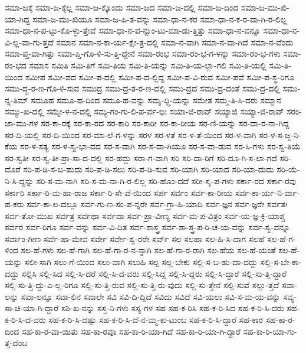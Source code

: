 {ಸಮಾ-ಜಕ್ಕೆ
ಸಮಾ-ಜ-ಕ್ಕೆಲ್ಲ
ಸಮಾ-ಜ-ಕ್ಕೊಂದು
ಸಮಾ-ಜದ
ಸಮಾ-ಜ-ದಲ್ಲಿ
ಸಮಾ-ಜ-ದಿಂದ
ಸಮಾ-ಜ-ಮು-ಖಿ-ಯಾ-ಗಿದ್ದ
ಸಮಾ-ಜ-ಮು-ಖಿಯೂ
ಸಮಾ-ಜ-ಹಿ-ತ-ವನ್ನು
ಸಮಾ-ಧಾ-ನ-ಕರ
ಸಮಾ-ಧಾ-ನ-ಕ-ರ-ವಾ-ಗಿ-ರ-ಲಿಲ್ಲ
ಸಮಾ-ಧಾ-ನ-ಪ-ಟ್ಟು-ಕೊ-ಳ್ಳು-ತ್ತೇವೆ
ಸಮಾ-ಧಾ-ನ-ವ-ನ್ನುಂ-ಟು-ಮಾ-ಡು-ತ್ತಿತ್ತು
ಸಮಾ-ಧಾ-ನ-ವನ್ನೂ
ಸಮಾ-ಧಾ-ನ-ವಿ-ಲ್ಲ-ವಾ-ಗು-ತ್ತದೆ
ಸಮಾನ
ಸಮಾ-ನ-ಕಾ-ರ್ಯ-ಕ್ಷೇ-ತ್ರ-ದಲ್ಲಿ
ಸಮಾ-ನ-ವಾಗಿ
ಸಮಾ-ನ-ವಾ-ಗಿದೆ
ಸಮಾ-ನ-ವೆಂದು
ಸಮಾ-ಪ್ತ-ವಾ-ಗಿತ್ತು
ಸಮಾ-ಪ್ತಿ-ಗೊ-ಳಿ-ಸು-ತ್ತಿ-ದ್ದೇನೆ
ಸಮಾ-ರಂಭ
ಸಮಾ-ರಂ-ಭ-ಗ-ಳನ್ನು
ಸಮಾ-ರಂ-ಭ-ಗಳು
ಸಮಾ-ರಂ-ಭದ
ಸಮಾಸ
ಸಮಿತಿ
ಸಮಿ-ತಿಗೆ
ಸಮಿ-ತಿಯ
ಸಮಿ-ತಿ-ಯನ್ನು
ಸಮಿ-ತಿ-ಯ-ಲ್ಲಾ-ಗಲಿ
ಸಮಿ-ತಿ-ಯಲ್ಲಿ
ಸಮಿ-ತಿ-ಯಿಂದ
ಸಮೀಪ
ಸಮೀ-ಪದ
ಸಮೀ-ಪ-ದಲ್ಲಿ
ಸಮೀ-ಪ-ದ-ಲ್ಲಿದ್ದ
ಸಮೀ-ಪ-ವಿ-ರುವ
ಸಮೀ-ಪವೆ
ಸಮೀ-ಪ-ಸ್ಥ-ರಿಗೂ
ಸಮು-ದ್ಧ-ರ-ಣ-ಗೊ-ಳಿ-ಸುವ
ಸಮುದ್ರ
ಸಮು-ದ್ರ-ತ-ರ-ಣ-ದಲ್ಲಿ
ಸಮು-ದ್ರದ
ಸಮು-ದ್ರ-ದಂತೆ
ಸಮು-ದ್ರ-ದಲ್ಲಿ
ಸಮು-ನ್ನ-ತಿಮ್
ಸಮೂಹ
ಸಮೂ-ಹ-ದಿಂದ
ಸಮೂ-ಹ-ವನ್ನು
ಸಮೃ-ಧ್ಧಿ-ಯನ್ನು
ಸಮೇತ
ಸಮ್ಮ-ತಿ-ಸಿ-ದರು
ಸಮ್ಮಾನ
ಸಮ್ಮು-ಖ-ದಲ್ಲಿ
ಸಮ್ಮೇ-ಳ-ನ-ದಲ್ಲಿ
ಸಮ್ಯ-ಗಂ-ಗು-ಲಿ-ಪ-ರ್ವ-ಭಿಃ
ಸಯಾ-ಜಿ-ರಾವ್
ಸಯ್ಯಾಜಿ
ಸಯ್ಯಾ-ಜಿ-ರಾವ್
ಸರಂ-ಜಾ-ಮು-ಗಳ
ಸರ-ಕಾ-ರಕ್ಕೆ
ಸರ-ಕಾ-ರದ
ಸರ-ಕಾರಿ
ಸರ-ಕಾರೀ
ಸರ-ಕಾ-ರೀಯ
ಸರ-ಣಿ-ಯನ್ನು
ಸರ-ದಾ-ರ-ನಾ-ಗಿದ್ದ
ಸರ-ದಿ-ಯಲ್ಲಿ
ಸರ-ದಿ-ಯಿಂದ
ಸರ-ಮಾ-ಲೆ-ಗ-ಳನ್ನು
ಸರಳ
ಸರ-ಳತೆ
ಸರ-ಳ-ತೆ-ಯಿಂದ
ಸರ-ಳ-ವಾಗಿ
ಸರ-ಳ-ಸ-ಜ್ಜ-ನಿ-ಕೆಯ
ಸರ-ಳ-ಸತ್ಯ
ಸರ-ಳ-ಸ್ವ-ಭಾ-ವದ
ಸರ-ಸ-ವಾಗಿ
ಸರ-ಸ-ವಾ-ಗಿಯೂ
ಸರ-ಸ-ವಾ-ಡುವ
ಸರ-ಸಿ-ಗಳು
ಸರ-ಸ್ವ-ತಿಯೆ
ಸರ-ಸ್ವತೀ
ಸರ-ಸ್ವ-ತೀ-ಪ್ರಾ-ಸಾ-ದ-ದಲ್ಲಿ
ಸರ-ಹದ್ದು
ಸರಾ-ಗ-ವಾಗಿ
ಸರಿ
ಸರಿ-ದಾ-ರಿಗೆ
ಸರಿ-ದೂ-ಗಿ-ಸ-ಲಾ-ಗದೆ
ಸರಿ-ದೊರೆ
ಸರಿ-ಪ-ಡಿ-ಸ-ಬ-ಹುದು
ಸರಿ-ಪ-ಡಿ-ಸಲು
ಸರಿ-ಪ-ಡಿ-ಸುವ
ಸರಿ-ಯಾಗಿ
ಸರಿ-ಯಾದ
ಸರಿ-ಯಾ-ದುದು
ಸರಿ-ಯೆ-ನಿ-ಸಿ-ದ್ದನ್ನು
ಸರಿ-ಸ-ಮ-ನಾಗಿ
ಸರಿ-ಸ-ಮ-ನಾ-ಗಿ-ರ-ಲಿಲ್ಲ
ಸರಿ-ಹೊಂ-ದದೆ
ಸರೀ-ಸೃ-ಪ-ಗಳು
ಸರ್ಕಾ-ರದ
ಸರ್ಕಾ-ರವು
ಸರ್ಕಾರಿ
ಸರ್ಕಾ-ರಿ-ಮ-ಹಾ-ರಾಜ
ಸರ್ಕಾ-ರಿ-ಸೇ-ವೆ-ಯಿಂದ
ಸರ್ಪ
ಸರ್ವಂ
ಸರ್ವ-ಕಾ-ರೀಯ
ಸರ್ವ-ಕಾ-ರ್ಯ-ನಿ-ರ್ವಾ-ಹ-ಕರು
ಸರ್ವ-ಕಾ-ಲ-ದಲ್ಲೂ
ಸರ್ವ-ಗು-ಣ-ಸಂ-ಪ-ನ್ನರೇ
ಸರ್ವ-ಗ್ರಾ-ಹಿ-ಯಾದಿ
ಸರ್ವ-ಜ್ಞನ
ಸರ್ವ-ಜ್ಞರೇ
ಸರ್ವತಃ
ಸರ್ವ-ತೋ-ಮುಖ
ಸರ್ವತ್ರ
ಸರ್ವಥಾ
ಸರ್ವದಾ
ಸರ್ವ-ಪ್ರಾ-ವೀಣ್ಯ
ಸರ್ವ-ಮ-ಪ-ವಿತ್ರಂ
ಸರ್ವ-ಯ-ಜ್ಞ-ಕ್ರಿ-ಯಾಶ್ಚ
ಸರ್ವರ
ಸರ್ವ-ರಿಗೂ
ಸರ್ವ-ವನ್ನು
ಸರ್ವ-ವಿ-ದಿತ
ಸರ್ವ-ಶಾಸ್ತ್ರ
ಸರ್ವ-ಶಾ-ಸ್ತ್ರ-ಪ-ರಿ-ಚ-ಯ-ವನ್ನು
ಸರ್ವ-ಸ್ವ-ವನ್ನೂ
ಸರ್ವಾಂ-ಗೀಣ
ಸರ್ವೆ-ಷಾ-ಮೇವ
ಸರ್ವೇ
ಸರ್ವೇ-ಶ್ವ-ರರೇ
ಸರ್ವ್
ಸಲ
ಸಲಹಾ
ಸಲ-ಹಿ-ಸಿ-ದಾಗ
ಸಲಹೆ
ಸಲ-ಹೆ-ಗ-ಳಿಂದ
ಸಲ-ಹೆ-ಗಳು
ಸಲ-ಹೆ-ಗಾಗಿ
ಸಲ-ಹೆ-ಗಾ-ರ-ನ-ನ್ನಾಗಿ
ಸಲ-ಹೆ-ಗಾ-ರ-ರಾಗಿ
ಸಲ-ಹೆಯ
ಸಲ-ಹೆ-ಯಂತೆ
ಸಲ-ಹೆ-ಯನ್ನು
ಸಲೀ-ಸಾಗಿ
ಸಲು-ಗೆ-ಯಿಂದ
ಸಲು-ವಾಗಿ
ಸಲುಹಿ
ಸಲ್ಪ
ಸಲ್ಲ-ಬೇಕು
ಸಲ್ಲಿ-ಸ-ಬ-ಹು-ದಾ-ದದ್ದು
ಸಲ್ಲಿ-ಸ-ಬೇ-ಕಾ-ದದ್ದು
ಸಲ್ಲಿಸಿ
ಸಲ್ಲಿ-ಸಿದ
ಸಲ್ಲಿ-ಸಿ-ದರೆ
ಸಲ್ಲಿ-ಸಿ-ದ-ವರು
ಸಲ್ಲಿ-ಸಿದ್ದ
ಸಲ್ಲಿ-ಸಿ-ದ್ದರು
ಸಲ್ಲಿ-ಸಿ-ದ್ದಾರೆ
ಸಲ್ಲಿ-ಸು-ತ್ತಿ-ದ್ದಾರೆ
ಸಲ್ಲಿ-ಸು-ತ್ತಿ-ದ್ದು-ಎ-ಲ್ಲ-ರಿಗೂ
ಸಲ್ಲಿ-ಸು-ತ್ತಿ-ರುವ
ಸಲ್ಲಿ-ಸು-ತ್ತಿ-ರು-ವುದು
ಸಲ್ಲಿ-ಸು-ತ್ತೇನೆ
ಸಲ್ಲಿ-ಸುವೆ
ಸಲ್ಲು-ತ್ತದೆ
ಸವಾ-ಲನ್ನು
ಸವಾ-ಲನ್ನೂ
ಸವಾ-ಲಿನ
ಸವಾಲೇ
ಸವಿ
ಸವಿ-ದಿ-ದ್ದಿದೆ
ಸವಿದು
ಸವಿದೆ
ಸವಿ-ಯಲು
ಸವಿ-ಸ-ಮ-ಯ-ವನ್ನು
ಸವ್ಯ-ಸಾ-ಚಿ-ಯಾ-ಗಿ-ದ್ದಾರೆ
ಸಶಿ-ಖ-ನನ್ನು
ಸಸ್ತ-ನಿ-ಗಳು
ಸಸ್ಯ-ಗಳ
ಸಹ
ಸಹ-ಕ-ರಿಸಿ
ಸಹ-ಕ-ರಿ-ಸಿದ
ಸಹ-ಕ-ರಿ-ಸಿ-ದರು
ಸಹ-ಕ-ರಿ-ಸಿ-ದ-ವರು
ಸಹ-ಕ-ರಿ-ಸಿ-ದಷ್ಟು
ಸಹ-ಕ-ರಿ-ಸಿ-ದೆ-ನ-ಮ್ಮ-ಕು-ಟುಂಬ
ಸಹ-ಕ-ರಿ-ಸಿ-ದ್ದಾರೆ
ಸಹ-ಕಾರ
ಸಹ-ಕಾ-ರ-ದಿಂದ
ಸಹ-ಕಾ-ರ-ವಾ-ಯಿತು
ಸಹ-ಕಾ-ರವೂ
ಸಹ-ಕಾ-ರಿ-ಯಾ-ಗಿದೆ
ಸಹ-ಕಾ-ರಿ-ಯಾ-ಗಿ-ದ್ದಾರೆ
ಸಹ-ಕಾ-ರಿ-ಯಾ-ಗು-ತ್ತ-ದೆಂಬ
}
